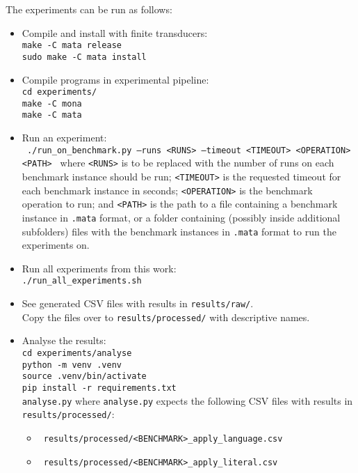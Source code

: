 The experiments can be run as follows:
\begin{itemize}
  \item Compile and install \mata with finite transducers:
  \\
  \texttt{make -C mata release}
  \\
  \texttt{sudo make -C mata install}

  \item Compile programs in experimental pipeline:
  \\
  \texttt{cd experiments/}
  \\
  \texttt{make -C mona}
  \\
  \texttt{make -C mata}

  \item Run an experiment:
  \\
  \texttt{
    ./run\_on\_benchmark.py --runs <RUNS> --timeout <TIMEOUT> <OPERATION> <PATH>
  }
  where \texttt{<RUNS>} is to be replaced with the number of runs on each benchmark instance should be run; \texttt{<TIMEOUT>} is the requested timeout for each benchmark instance in seconds; \texttt{<OPERATION>} is the benchmark operation to run; and \texttt{<PATH>} is the path to a file containing a benchmark instance in \texttt{.mata} format, or a folder containing (possibly inside additional subfolders) files with the benchmark instances in \texttt{.mata} format to run the experiments on.

  \item Run all experiments from this work:
  \\
  \texttt{./run\_all\_experiments.sh}

  \item See generated CSV files with results in \texttt{results/raw/}.
  \\Copy the files over to \texttt{results/processed/} with descriptive names.

  \item Analyse the results:
  \\
  \texttt{cd experiments/analyse}
  \\
  \texttt{python -m venv .venv}
  \\
  \texttt{source .venv/bin/activate}
  \\
  \texttt{pip install -r requirements.txt}
  \\
  \texttt{analyse.py}
  where \texttt{analyse.py} expects the following CSV files with results in \\\texttt{results/processed/}:
  \begin{itemize}
    \item \texttt{
    results/processed/<BENCHMARK>\_apply\_language.csv
    }
    \item \texttt{
      results/processed/<BENCHMARK>\_apply\_literal.csv
    }


\end{itemize}
\end{itemize}
